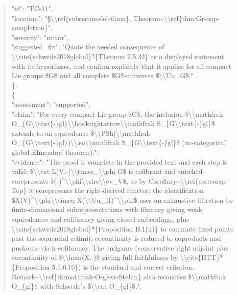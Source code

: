 \documentclass[11pt]{article}
\begin{document}
\begin{quote}
      "id": "TC-11",\\
      "location": "§\textbackslash{}\textbackslash{}ref\{subsec:model-thom\}, Theorem\~{}\textbackslash{}\textbackslash{}ref\{thm:Gr-oup-completion\}",\\
      "severity": "minor",\\
      "suggested\_fix": "Quote the needed consequence of \textbackslash{}\textbackslash{}cite\{schwede2018global\}*\{Theorem 2.5.33\} as a displayed statement with its hypotheses, and confirm explicitly that it applies for all compact Lie groups \$G\$ and all complete \$G\$-universes \$\textbackslash{}\textbackslash{}Uu\_G\$."\\
    \},\\
    \{\\
      "assessment": "supported",\\
      "claim": "For every compact Lie group \$G\$, the inclusion \$\textbackslash{}\textbackslash{}mathfrak O\_\{G\textbackslash{}\textbackslash{}text\{-\}gl\}\textbackslash{}\textbackslash{}hookrightarrow\textbackslash{}\textbackslash{}mathfrak S\_\{G\textbackslash{}\textbackslash{}text\{-\}gl\}\$ extends to an equivalence \$\textbackslash{}\textbackslash{}PSh(\textbackslash{}\textbackslash{}mathfrak O\_\{G\textbackslash{}\textbackslash{}text\{-\}gl\})\textbackslash{}\textbackslash{}iso\textbackslash{}\textbackslash{}mathfrak S\_\{G\textbackslash{}\textbackslash{}text\{-\}gl\}\$ (\ensuremath{\infty}-categorical global Elmendorf theorem).",\\
      "evidence": "The proof is complete in the provided text and each step is valid: \$\textbackslash{}\textbackslash{}cat L(V,-)\textbackslash{}\textbackslash{}times\_\textbackslash{}\textbackslash{}phi G\$ is cofibrant and enriched-corepresents \$(-)\^{}\textbackslash{}\textbackslash{}phi\textbackslash{}\textbackslash{}circ\textbackslash{}\textbackslash{}ev\_V\$, so by Corollary\~{}\textbackslash{}\textbackslash{}ref\{cor:corep-Top\} it corepresents the right-derived functor; the identification \$X(V)\^{}\textbackslash{}\textbackslash{}phi\textbackslash{}\textbackslash{}simeq X(\textbackslash{}\textbackslash{}Uu\_H)\^{}\textbackslash{}\textbackslash{}phi\$ uses an exhaustive filtration by finite-dimensional subrepresentations with fibrancy giving weak equivalences and cofibrancy giving closed embeddings, plus \textbackslash{}\textbackslash{}cite\{schwede2018global\}*\{Proposition B.1(ii)\} to commute fixed points past the sequential colimit; cocontinuity is reduced to coproducts and pushouts via h-cofibrancy. The endgame (conservative right adjoint plus cocontinuity of \$\textbackslash{}\textbackslash{}hom(X,-)\$ giving full faithfulness by \textbackslash{}\textbackslash{}cite\{HTT\}*\{Proposition 5.1.6.10\}) is the standard and correct criterion. Remark\~{}\textbackslash{}\textbackslash{}ref\{rk:mathfrak-O-gl-vs-Stefan\} also reconciles \$\textbackslash{}\textbackslash{}mathfrak O\_\{gl\}\$ with Schwede's \$\textbackslash{}\textbackslash{}cat O\_\{gl\}\$.",\\

\end{quote}
\end{document}
